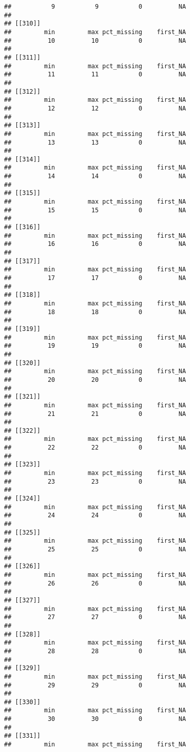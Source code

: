 \documentclass[
]{article}
\begin{document}
\begin{verbatim}
##           9           9           0          NA 
## 
## [[310]]
##         min         max pct_missing    first_NA 
##          10          10           0          NA 
## 
## [[311]]
##         min         max pct_missing    first_NA 
##          11          11           0          NA 
## 
## [[312]]
##         min         max pct_missing    first_NA 
##          12          12           0          NA 
## 
## [[313]]
##         min         max pct_missing    first_NA 
##          13          13           0          NA 
## 
## [[314]]
##         min         max pct_missing    first_NA 
##          14          14           0          NA 
## 
## [[315]]
##         min         max pct_missing    first_NA 
##          15          15           0          NA 
## 
## [[316]]
##         min         max pct_missing    first_NA 
##          16          16           0          NA 
## 
## [[317]]
##         min         max pct_missing    first_NA 
##          17          17           0          NA 
## 
## [[318]]
##         min         max pct_missing    first_NA 
##          18          18           0          NA 
## 
## [[319]]
##         min         max pct_missing    first_NA 
##          19          19           0          NA 
## 
## [[320]]
##         min         max pct_missing    first_NA 
##          20          20           0          NA 
## 
## [[321]]
##         min         max pct_missing    first_NA 
##          21          21           0          NA 
## 
## [[322]]
##         min         max pct_missing    first_NA 
##          22          22           0          NA 
## 
## [[323]]
##         min         max pct_missing    first_NA 
##          23          23           0          NA 
## 
## [[324]]
##         min         max pct_missing    first_NA 
##          24          24           0          NA 
## 
## [[325]]
##         min         max pct_missing    first_NA 
##          25          25           0          NA 
## 
## [[326]]
##         min         max pct_missing    first_NA 
##          26          26           0          NA 
## 
## [[327]]
##         min         max pct_missing    first_NA 
##          27          27           0          NA 
## 
## [[328]]
##         min         max pct_missing    first_NA 
##          28          28           0          NA 
## 
## [[329]]
##         min         max pct_missing    first_NA 
##          29          29           0          NA 
## 
## [[330]]
##         min         max pct_missing    first_NA 
##          30          30           0          NA 
## 
## [[331]]
##         min         max pct_missing    first_NA 

\end{verbatim}
\end{document}
